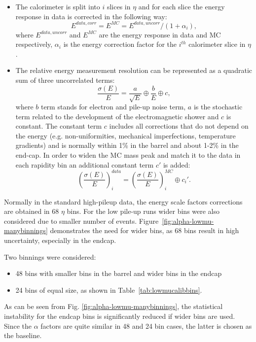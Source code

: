     \begin{itemize}
    	\item The calorimeter is split into $i$ slices in $\eta$ and for each slice the energy response in data is corrected in the following way:
    	\begin{equation*}
    		E^{data,corr}=E^{MC}=E^{data,uncorr}/(1+\alpha_i),
    	\end{equation*}
    	where $E^{data,uncorr}$ and $E^{MC}$ are the energy response in data and MC respectively, $\alpha_i$ is the energy correction factor for the $i^{th}$ calorimeter slice in $\eta$.
    	\item The relative energy measurement resolution can be represented as a quadratic sum of three uncorrelated terms:
    	\begin{equation*}
    	\frac{\sigma(E)}{E}=\frac{a}{\sqrt{E}} \oplus \frac{b}{E} \oplus c,
    	\end{equation*}
    	where $b$ term stands for electron and pile-up noise term, $a$ is the stochastic term related to the development of the electromagnetic shower and $c$ is constant. The constant term $c$ includes all corrections that do not depend on the energy (e.g. non-uniformities, mechanical imperfections, temperature gradients) and is normally within 1\% in the barrel and about 1-2\% in the end-cap. In order to widen the MC mass peak and match it to the data in each rapidity bin an additional constant term $c'$ is added: 
    	\begin{equation*}
    	\left(\frac{\sigma(E)}{E}\right)^{data}_i= \left(\frac{\sigma(E)}{E}\right)^{MC}_i \oplus c_i'.
    	\end{equation*}
    \end{itemize}

Normally in the standard high-pileup data, the energy scale factors corrections are obtained in 68 $\eta$ bins.
For the low pile-up runs wider bins were also considered due to smaller number of \Zee events. 
Figure~\ref{fig:alpha-lowmu-manybinnings} demonstrates the need for wider bins, as 68 bins result in high uncertainty, especially in the endcap.

Two binnings were considered:
\begin{itemize}
	\item 48 bins with smaller bins in the barrel and wider bins in the endcap
	\item 24 bins of equal size, as shown in Table~\ref{tab:lowmucalibbins}.
\end{itemize}
 As can be seen from Fig. \ref{fig:alpha-lowmu-manybinnings}, the
statistical instability for the endcap bins is significantly reduced if wider bins are used. 
Since the $\alpha$ factors are quite similar in 48 and 24 bin cases, the latter is chosen as the baseline.


